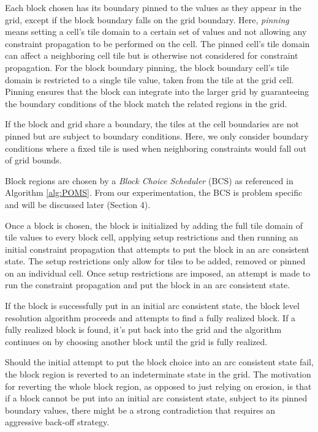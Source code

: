 Each block chosen has its boundary pinned to the values as they appear in the grid,
except if the block boundary falls on the grid boundary.
Here, \textit{pinning} means setting a cell's tile domain to a certain set of values
and not allowing any constraint propagation to be performed on the cell.
The pinned cell's tile domain can affect a neighboring cell tile but is otherwise not
considered for constraint propagation.
For the block boundary pinning, the block boundary cell's tile domain is restricted to a single tile value,
taken from the tile at the grid cell.
Pinning ensures that the block can integrate into the larger grid by guaranteeing
the boundary conditions of the block match the related regions in the grid.

If the block and grid share a boundary, the tiles at the cell boundaries are not
pinned but are subject to boundary conditions.
Here, we only consider boundary conditions where a fixed tile is used when neighboring
constraints would fall out of grid bounds.

Block regions are chosen by a \textit{Block Choice Scheduler} (BCS) as referenced in Algorithm \ref{alg:POMS}.
From our experimentation, the BCS is problem specific and will be discussed later (Section 4).

Once a block is chosen, the block is initialized by adding the full tile domain of tile values
to every block cell, applying setup restrictions and then running an initial constraint propagation
that attempts to put the block in an arc consistent state.
The setup restrictions only allow for tiles to be added, removed
or pinned on an individual cell.
Once setup restrictions are imposed, an attempt is made to run the constraint propagation and
put the block in an arc consistent state.

If the block is successfully put in an initial arc consistent state, the block level resolution algorithm proceeds and attempts to find a fully realized block.
If a fully realized block is found, it's put back into the grid and the algorithm
continues on by choosing another block until the grid is fully realized.

Should the initial attempt to put the block choice into an arc consistent state fail,
the block region is reverted to an indeterminate state in the grid.
The motivation for reverting the whole block region, as opposed to just relying on erosion,
is that if a block cannot be put into an initial arc consistent state, subject to its pinned
boundary values, there might be a strong contradiction that requires an aggressive
back-off strategy.


